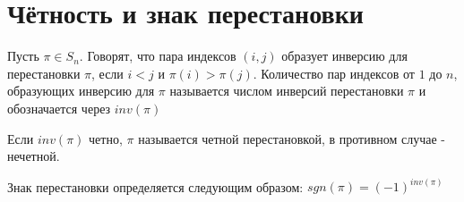 
\section{Чётность и знак перестановки}
\begin{conj}
    Пусть $\pi \in S_n$. Говорят, что пара индексов $(i,j)$ образует инверсию для перестановки
    $\pi$, если $i < j$ и $\pi(i) > \pi(j)$. Количество пар индексов от $1$ до $n$, образующих инверсию для
    $\pi$ называется числом инверсий перестановки $\pi$ и обозначается через $inv(\pi)$
\end{conj}

\begin{conj}
    Если $inv(\pi)$ четно, $\pi$ называется четной перестановкой, в противном случае - нечетной.
\end{conj}

\begin{conj}
    Знак перестановки определяется следующим образом: $sgn(\pi) = (-1)^{inv(\pi)}$
\end{conj}

